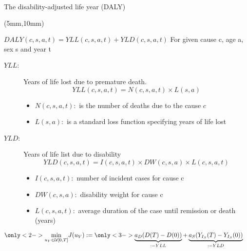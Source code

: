 \begin{frame}{The disability-adjusted life year (DALY)}
    \begin{textblock*}{120mm}(5mm,10mm)
        \begin{graybox}{{$DALY(c,s,a,t) = YLL(c,s,a,t) + YLD(c,s,a,t)$}}
            For given cause c, age a, sex s and year t
            \begin{description}
                \item[$YLL:$] Years of life lost due to premature death.
                    $$
                        YLL(c,s,a,t) = N(c,s,a,t) \times L(s,a)
                    $$
                    \begin{itemize}
                         \item
                             $N(c,s,a,t):$ is the number of 
                             deaths due to the cause $c$ 
                         \item
                             $L(s,a):$ is a standard loss 
                             function specifying years of life lost 
                    \end{itemize}
                 \item[$YLD:$] Years of life list due to disability   
                     $$
                         YLD(c,s,a,t) = I(c,s,a,t) \times DW(c,s,a) 
                         \times L(c,s,a,t)
                     $$
                    \begin{itemize}
                        \item
                            $I(c,s,a,t):$ number of incident cases for cause c
                        \item
                            $DW(c,s,a):$ disability weight for cause c
                        \item
                            $L(c,s,a,t):$  average duration of the case 
                            until remission or death (years)
                    \end{itemize}
            \end{description}
       \end{graybox}
       \begin{equation*}
            \begin{aligned}
             & \only<2->{\min_{u_V  \in \mathcal{U}[0, T]}}
             J(u_V) :=
             \only<3->{
                \underbrace{a_D ( D(T) - D(0))}_{:=YLL}  +
                \underbrace{a_S (Y_{I_S}(T) - Y_{I_S}(0))}_{:=YLD}
             }
            \end{aligned}
       \end{equation*}        
    \end{textblock*}
    \end{frame}

